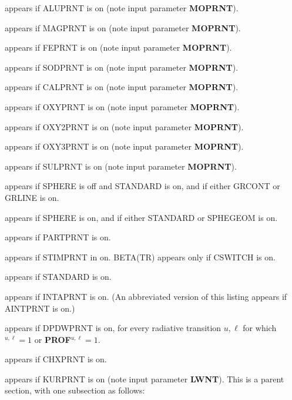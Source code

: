 \blankline
{} \par
appears if ALUPRNT is on (note input parameter {\bf MOPRNT}).
\blankline
{} \par
appears if MAGPRNT is on (note input parameter {\bf MOPRNT}).
\blankline
{} \par
appears if FEPRNT is on (note input parameter {\bf MOPRNT}).
\blankline
{} \par
appears if SODPRNT is on (note input parameter {\bf MOPRNT}).
\blankline
{} \par
appears if CALPRNT is on (note input parameter {\bf MOPRNT}).
\blankline
{} \par
appears if OXYPRNT is on (note input parameter {\bf MOPRNT}).
\blankline
{} \par
appears if OXY2PRNT is on (note input parameter {\bf MOPRNT}).
\blankline
{} \par
appears if OXY3PRNT is on (note input parameter {\bf MOPRNT}).
\blankline
{} \par
appears if SULPRNT is on (note input parameter {\bf MOPRNT}).
\ej
{} \par
appears if SPHERE is off and STANDARD is on, and if either
GRCONT or \break GRLINE is on.
\blankline
{} \par
appears if SPHERE is on, and if either STANDARD or
SPHEGEOM is on.
\blankline
{} \par
appears if PARTPRNT is on.
\blankline
{} \par
appears if STIMPRNT in on. BETA(TR) appears only if CSWITCH is on.
\blankline
{} \par
appears if STANDARD is on.
\blankline
{} \par
appears if INTAPRNT is on. (An abbreviated version of this listing
appears if AINTPRNT is on.)
\blankline
{} \par
appears if DPDWPRNT is on, for every radiative transition $u,\ell$ for
which $^{u,\ell} = 1$ or {\bf PROF}$^{u,\ell} = 1$.
\blankline
{} \par
appears if CHXPRNT is on.
\ej
{} \par
appears if KURPRNT is on (note input parameter {\bf LWNT}).
This is a parent section, with one subsection as follows:
